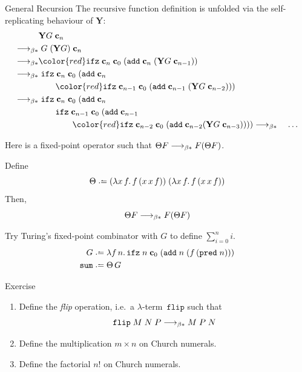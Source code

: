 \begin{frame}[allowframebreaks]{General Recursion}
  The recursive function definition is unfolded via the self-replicating
  behaviour of $\mathbf{Y}$:
  \begin{align*}
    & \mathbf{Y}G\;\bc_n \\
    \reduce &\;G\;(\mathbf{Y}G)\;\bc_n \\
    \reduce &
    {\color{red}\mathtt{ifz}\;\bc_n\;\bc_0\;(\add\;\bc_n\;(\mathbf{Y}G\;\bc_{n-1}))}
    \\
    \reduce &\;\mathtt{ifz}\;\bc_n\;\bc_0\;(\add\;\bc_n\\
            & \qquad {\color{red} \mathtt{ifz}\;\bc_{n-1}\;\bc_0\;(\add\;\bc_{n-1}
  \;(\mathbf{Y}G\;\bc_{n-2}))}) \\
    \reduce &\;\mathtt{ifz}\;\bc_n\;\bc_0\;(\add\;\bc_n\\
            & \qquad \mathtt{ifz}\;\bc_{n-1}\;\bc_0\;(\add\;\bc_{n-1} \\
            & \qquad \qquad {\color{red}\mathtt{ifz}\;\bc_{n-2}\;\bc_0\;(\add\;\bc_{n-2}
  (\mathbf{Y}G\;\bc_{n-3}))})) \reduce &\;\dots
  \end{align*}
  
\framebreak
Here is a fixed-point operator such that $\Theta F \longrightarrow_{\beta*} F(\Theta F)$.
\begin{proposition}
  Define 
  \[
    \Theta \defeq 
    (\lambda x\,f.\,f\,(x\,x\,f))\;
    (\lambda x\,f.\,f\,(x\,x\,f))
  \]
  Then, 
  \[
    \Theta F \longrightarrow_{\beta*} F (\Theta F)
  \]
\end{proposition}
Try Turing's fixed-point combinator with $G$ to define $\sum_{i=0}^n i$.
\begin{align*}
  G \defeq{} &
  \lambda f\,n.\,
  \mathtt{ifz}\;n\;\bc_0\;
  (\add\;n\;(f\,(\mathtt{pred}\;n))) \\
  \mathtt{sum} \defeq\; & \Theta\,G 
\end{align*}

\begin{block}{Exercise}
\begin{enumerate}
  \item Define the \emph{flip} operation, i.e.\ a $\lambda$-term~$\mathtt{flip}$
    such that
    \[
      \mathtt{flip}\;M\;N\;P
      \longrightarrow_{\beta*} M\;P\;N
    \]
  \item Define the multiplication $m \times n$ on Church numerals.
  \item Define the factorial $n!$ on Church numerals.
\end{enumerate}
\end{block}


\end{frame}
